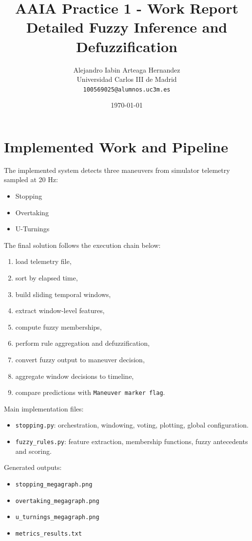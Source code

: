 \documentclass[11pt,a4paper]{article}
\title{AAIA Practice 1 - Work Report\\Detailed Fuzzy Inference and Defuzzification}
\author{Alejandro Iabin Arteaga Hernandez\\Universidad Carlos III de Madrid\\\texttt{100569025@alumnos.uc3m.es}}
\date{\today}
\begin{document}
\maketitle

\section{Implemented Work and Pipeline}
The implemented system detects three maneuvers from simulator telemetry sampled at 20 Hz:
\begin{itemize}
    \item Stopping
    \item Overtaking
    \item U-Turnings
\end{itemize}

The final solution follows the execution chain below:
\begin{enumerate}
    \item load telemetry file,
    \item sort by elapsed time,
    \item build sliding temporal windows,
    \item extract window-level features,
    \item compute fuzzy memberships,
    \item perform rule aggregation and defuzzification,
    \item convert fuzzy output to maneuver decision,
    \item aggregate window decisions to timeline,
    \item compare predictions with \texttt{Maneuver marker flag}.
\end{enumerate}

Main implementation files:
\begin{itemize}
    \item \texttt{stopping.py}: orchestration, windowing, voting, plotting, global configuration.
    \item \texttt{fuzzy\_rules.py}: feature extraction, membership functions, fuzzy antecedents and scoring.
\end{itemize}

Generated outputs:
\begin{itemize}
    \item \texttt{stopping\_megagraph.png}
    \item \texttt{overtaking\_megagraph.png}
    \item \texttt{u\_turnings\_megagraph.png}
    \item \texttt{metrics\_results.txt}
\end{itemize}
\end{document}
